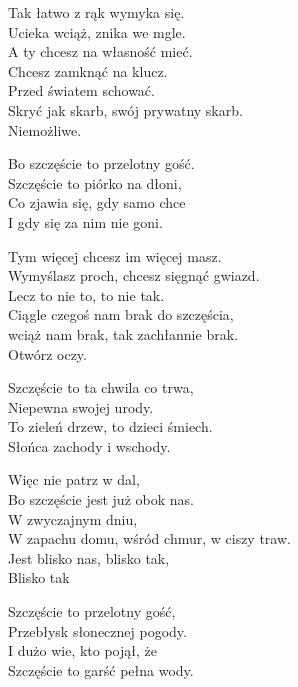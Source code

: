\begin{text}
    Tak łatwo z rąk wymyka się.\\
    Ucieka wciąż, znika we mgle.\\
    A ty chcesz na własność mieć.\\
    Chcesz zamknąć na klucz.\\
    Przed światem schować.\\
    Skryć jak skarb, swój prywatny skarb.\\
    Niemożliwe.

    Bo szczęście to przelotny gość.\\
    Szczęście to piórko na dłoni,\\
    Co zjawia się, gdy samo chce\\
    I gdy się za nim nie goni.

    Tym więcej chcesz im więcej masz.\\
    Wymyślasz proch, chcesz sięgnąć gwiazd.\\
    Lecz to nie to, to nie tak.\\
    Ciągle czegoś nam brak do szczęścia,\\
    wciąż nam brak, tak zachłannie brak.\\
    Otwórz oczy.

    Szczęście to ta chwila co trwa,\\
    Niepewna swojej urody.\\
    To zieleń drzew, to dzieci śmiech.\\
    Słońca zachody i wschody.

    Więc nie patrz w dal,\\
    Bo szczęście jest już obok nas.\\
    W zwyczajnym dniu,\\
    W zapachu domu, wśród chmur, w ciszy traw.\\
    Jest blisko nas, blisko tak,\\
    Blisko tak

    Szczęście to przelotny gość,\\
    Przebłysk słonecznej pogody.\\
    I dużo wie, kto pojął, że\\
    Szczęście to garść pełna wody.
\end{text}
\begin{chord}

\end{chord}